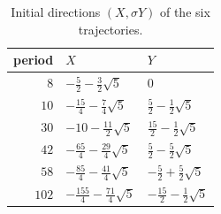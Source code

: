 \documentclass[11pt]{article}
\theoremstyle{definition}
\theoremstyle{remark}
\begin{document}
\begin{table}[h]
\centering
\renewcommand{\arraystretch}{1.3}
\begin{tabular}{rll}
\toprule
period & $X$ & $Y$\\
\midrule
$8$ & $-\tfrac52-\tfrac32\sqrt5$ & $0$\\
$10$ & $-\tfrac{15}4-\tfrac74\sqrt5$ & $\tfrac52-\tfrac12\sqrt5$\\
$30$ & $-10-\tfrac{11}2\sqrt5$ & $\tfrac{15}2-\tfrac12\sqrt5$\\
$42$ & $-\tfrac{65}4-\tfrac{29}4\sqrt5$ & $\tfrac52-\tfrac52\sqrt5$\\
$58$ & $-\tfrac{85}4-\tfrac{41}4\sqrt5$ & $-\tfrac52+\tfrac52\sqrt5$\\
$102$ & $-\tfrac{155}4-\tfrac{71}4\sqrt5$ & $-\tfrac{15}2-\tfrac12\sqrt5$\\
\bottomrule
\end{tabular}
\caption{Initial directions $(X,\sigma Y)$ of the six trajectories.}
\label{tab:small}
\end{table}
\end{document}
